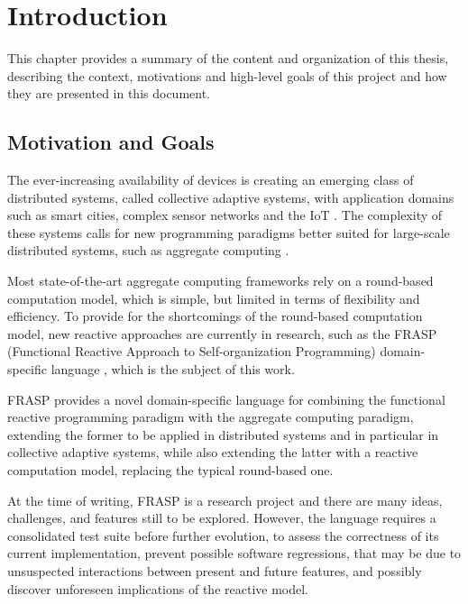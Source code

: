 
\chapter{Introduction}
\label{chapter:introduction}

This chapter provides a summary of the content and organization of this thesis,
describing the context, motivations and high-level goals of this project and
how they are presented in this document.

\section{Motivation and Goals}
\label{section:introduction:content}

The ever-increasing availability of devices is creating an emerging class of
distributed systems, called collective adaptive systems, with application
domains such as smart cities, complex sensor networks and the \ac{IoT}
\cite{CAS-AggregateComputingBlocks}. The complexity of these systems calls for
new programming paradigms better suited for large-scale distributed systems,
such as aggregate computing \cite{FieldCalculus-AggregateComputing}.

Most state-of-the-art aggregate computing frameworks rely on a round-based
computation model, which is simple, but limited in terms of flexibility and
efficiency. To provide for the shortcomings of the round-based computation
model, new reactive approaches are currently in research, such as the FRASP
(Functional Reactive Approach to Self-organization Programming) domain-specific
language \cite{FRASP}, which is the subject of this work.

FRASP provides a novel domain-specific language for combining the functional
reactive programming paradigm with the aggregate computing paradigm, extending
the former to be applied in distributed systems and in particular in collective
adaptive systems, while also extending the latter with a reactive computation
model, replacing the typical round-based one.

At the time of writing, FRASP is a research project and there are many ideas,
challenges, and features still to be explored. However, the language requires a
consolidated test suite before further evolution, to assess the correctness of
its current implementation, prevent possible software regressions, that may be
due to unsuspected interactions between present and future features, and
possibly discover unforeseen implications of the reactive model.

